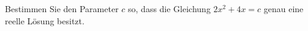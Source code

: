 \begin{ExerciseBlock}
Bestimmen Sie den Parameter $c$ so, dass die Gleichung $\displaystyle 2x^2+4x=c$ genau eine reelle Lösung besitzt.

\end{ExerciseBlock}
